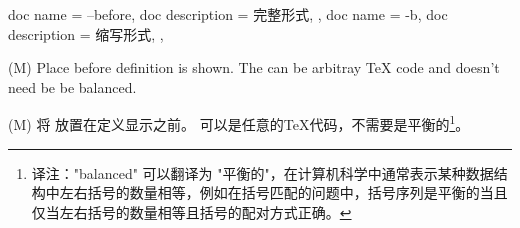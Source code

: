 \begin{docKeys}[
    doc no index,   %
    doc parameter = {~\meta{code}},
    ]
    {
    {
        doc name        = --before,
        doc description = 完整形式,
    },
    {
        doc name        = -b,
        doc description = 缩写形式,
    },
    }
    
    (M) Place  before definition is shown. 
    The  can be arbitray TeX code and doesn't need be be balanced.
    
    (M) 将 放置在定义显示之前。  可以是任意的TeX代码，不需要是平衡的\footnote{译注："balanced" 可以翻译为 "平衡的"，在计算机科学中通常表示某种数据结构中左右括号的数量相等，例如在括号匹配的问题中，括号序列是平衡的当且仅当左右括号的数量相等且括号的配对方式正确。}。
    
\end{docKeys} 
    
    